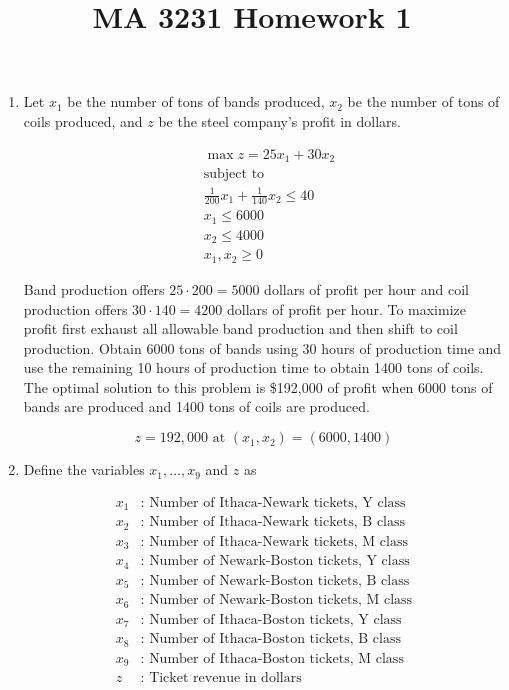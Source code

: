 \documentclass{article}
\title{MA 3231 Homework 1}
\begin{document}
\maketitle

\begin{enumerate}

\item 

Let $x_1$ be the number of tons of bands produced, $x_2$ be the number of tons of coils produced, and $z$ be the steel company's profit in dollars.

\begin{align*}
&\max z = 25x_1 + 30x_2 \\
&\text{subject to}\\
&\frac{1}{200}x_1 + \frac{1}{140}x_2 \leq 40 \\
&x_1 \leq 6000 \\
&x_2 \leq 4000 \\
&x_1,x_2 \geq 0
\end{align*}

Band production offers $25\cdot 200 = 5000$ dollars of profit per hour and coil production offers $30 \cdot 140 = 4200$ dollars of profit per hour. To maximize profit first exhaust all allowable band production and then shift to coil production. Obtain 6000 tons of bands using 30 hours of production time and use the remaining 10 hours of production time to obtain 1400 tons of coils. The optimal solution to this problem is \$192,000 of profit when 6000 tons of bands are produced and 1400 tons of coils are produced.

$$
\boxed{z = 192,000 \text{ at } (x_1,x_2) = (6000,1400)}
$$


\newpage
\item 

Define the variables $x_1, \dots , x_9$ and  $z$ as

\begin{align*}
x_1 &: \text{ Number of Ithaca-Newark tickets, Y class} \\
x_2 &: \text{ Number of Ithaca-Newark tickets, B class} \\
x_3 &: \text{ Number of Ithaca-Newark tickets, M class} \\
x_4 &: \text{ Number of Newark-Boston tickets, Y class} \\
x_5 &: \text{ Number of Newark-Boston tickets, B class} \\
x_6 &: \text{ Number of Newark-Boston tickets, M class} \\
x_7 &: \text{ Number of Ithaca-Boston tickets, Y class} \\
x_8 &: \text{ Number of Ithaca-Boston tickets, B class} \\
x_9 &: \text{ Number of Ithaca-Boston tickets, M class} \\
z &: \text{ Ticket revenue in dollars}
\end{align*}


\end{enumerate}
\end{document}
